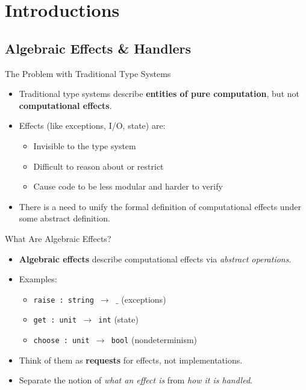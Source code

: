 \section{Introductions}
\subsection{Algebraic Effects \& Handlers}


\begin{frame}{The Problem with Traditional Type Systems}
  \begin{itemize}
    \item Traditional type systems describe \textbf{entities of pure computation}, but not \textbf{computational effects}.
    \vspace{0.5em}
    \item Effects (like exceptions, I/O, state) are:
      \begin{itemize}
        \item Invisible to the type system
        \item Difficult to reason about or restrict
        \item Cause code to be less modular and harder to verify
      \end{itemize}
    \vspace{0.5em}
    \item There is a need to unify the formal definition of computational effects under some abstract definition.
  \end{itemize}
\end{frame}
\begin{frame}{What Are Algebraic Effects?}
  \begin{itemize}
    \item \textbf{Algebraic effects} describe computational effects via \textit{abstract operations}.
    \vspace{0.5em}
    \item Examples:
      \begin{itemize}
        \item \texttt{raise : string $\to$ $\_$} \hfill (exceptions)
        \item \texttt{get : unit $\to$ int} \hfill (state)
        \item \texttt{choose : unit $\to$ bool} \hfill (nondeterminism)
      \end{itemize}
    \vspace{0.5em}
    \item Think of them as \textbf{requests} for effects, not implementations.
    \vspace{0.5em}
    \item Separate the notion of \textit{what an effect is} from \textit{how it is handled}.
  \end{itemize}
\end{frame}
% 

